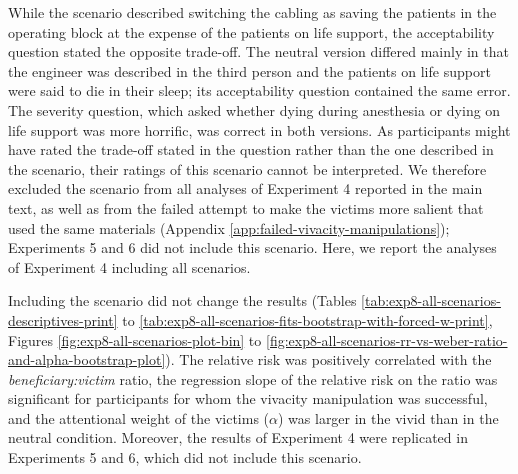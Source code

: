 \documentclass[
]{article}
\begin{document}
While the scenario described switching the cabling as saving the patients in the operating block at the expense of the patients on life support, the acceptability question stated the opposite trade-off. The neutral version differed mainly in that the engineer was described in the third person and the patients on life support were said to die in their sleep; its acceptability question contained the same error. The severity question, which asked whether dying during anesthesia or dying on life support was more horrific, was correct in both versions. As participants might have rated the trade-off stated in the question rather than the one described in the scenario, their ratings of this scenario cannot be interpreted. We therefore excluded the scenario from all analyses of Experiment 4 reported in the main text, as well as from the failed attempt to make the victims more salient that used the same materials (Appendix \ref{app:failed-vivacity-manipulations}); Experiments 5 and 6 did not include this scenario. Here, we report the analyses of Experiment 4 including all scenarios.

Including the scenario did not change the results (Tables \ref{tab:exp8-all-scenarios-descriptives-print} to \ref{tab:exp8-all-scenarios-fits-bootstrap-with-forced-w-print}, Figures \ref{fig:exp8-all-scenarios-plot-bin} to \ref{fig:exp8-all-scenarios-rr-vs-weber-ratio-and-alpha-bootstrap-plot}). The relative risk was positively correlated with the \emph{beneficiary:victim} ratio, the regression slope of the relative risk on the ratio was significant for participants for whom the vivacity manipulation was successful, and the attentional weight of the victims (\(\alpha\)) was larger in the vivid than in the neutral condition. Moreover, the results of Experiment 4 were replicated in Experiments 5 and 6, which did not include this scenario.

\begingroup\fontsize{7}{9}\selectfont
\end{document}
